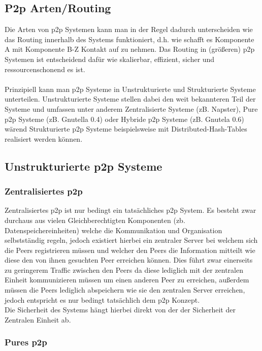 \documentclass[a4paper,12pt]{scrreprt}
\begin{document}
			\subsection{P2p Arten/Routing}
			
				Die Arten von p2p Systemen kann man in der Regel dadurch unterscheiden wie das Routing innerhalb des Systems funktioniert, d.h. wie schafft es Komponente A mit Komponente B-Z Kontakt auf zu nehmen. Das Routing in (größeren) p2p Systemen ist entscheidend dafür wie skalierbar, effizient, sicher und ressourcenschonend es ist.
				\\\\Prinzipiell kann man p2p Systeme in Unstrukturierte und Strukturierte Systeme unterteilen. Unstrukturierte Systeme stellen dabei den weit bekannteren Teil der Systeme und umfassen unter anderem Zentralisierte Systeme (zB. Napster), Pure p2p Systeme (zB. Gnutella 0.4) oder Hybride p2p Systeme (zB. Gnutela 0.6) wärend Strukturierte p2p Systeme beispielsweise mit Distributed-Hash-Tables realisiert werden können. %
				
			\subsection{Unstrukturierte p2p Systeme}
				\subsubsection{Zentralisiertes p2p}
					
					Zentralisiertes p2p ist nur bedingt ein tatsächliches p2p System. Es besteht zwar durchaus aus vielen Gleichberechtigten Komponenten (zb. Datenspeichereinheiten) welche die Kommunikation und Organisation selbstständig regeln, jedoch existiert hierbei ein zentraler Server bei welchem sich die Peers registrieren müssen und welcher den Peers die Information mitteilt wie diese den von ihnen gesuchten Peer erreichen können. Dies führt zwar einerseits zu geringerem Traffic zwischen den Peers da diese lediglich mit der zentralen Einheit kommunizieren müssen um einen anderen Peer zu erreichen, außerdem müssen die Peers lediglich abspeichern wie sie den zentralen Server erreichen, jedoch entspricht es nur bedingt tatsächlich dem p2p Konzept.\\
					Die Sicherheit des Systems hängt hierbei direkt von der der Sicherheit der Zentralen Einheit ab.
					
				\subsubsection{Pures p2p}
					
\end{document}

